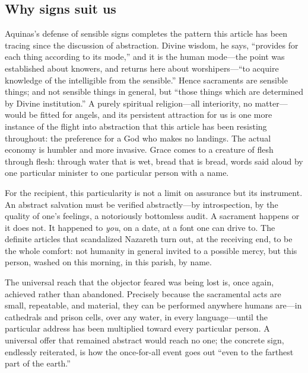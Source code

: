\subsection{Why signs suit us}

Aquinas's defense of sensible signs completes the pattern this article has been tracing since the discussion of abstraction. Divine wisdom, he says, ``provides for each thing according to its mode,'' and it is the human mode---the point was established about knowers, and returns here about worshipers---``to acquire knowledge of the intelligible from the sensible.'' Hence sacraments are sensible things; and not sensible things in general, but ``those things which are determined by Divine institution.'' A purely spiritual religion---all interiority, no matter---would be fitted for angels, and its persistent attraction for us is one more instance of the flight into abstraction that this article has been resisting throughout: the preference for a God who makes no landings. The actual economy is humbler and more invasive. Grace comes to a creature of flesh through flesh: through water that is wet, bread that is bread, words said aloud by one particular minister to one particular person with a name.

For the recipient, this particularity is not a limit on assurance but its instrument. An abstract salvation must be verified abstractly---by introspection, by the quality of one's feelings, a notoriously bottomless audit. A sacrament happens or it does not. It happened to \emph{you}, on a date, at a font one can drive to. The definite articles that scandalized Nazareth turn out, at the receiving end, to be the whole comfort: not humanity in general invited to a possible mercy, but this person, washed on this morning, in this parish, by name.

The universal reach that the objector feared was being lost is, once again, achieved rather than abandoned. Precisely because the sacramental acts are small, repeatable, and material, they can be performed anywhere humans are---in cathedrals and prison cells, over any water, in every language---until the particular address has been multiplied toward every particular person. A universal offer that remained abstract would reach no one; the concrete sign, endlessly reiterated, is how the once-for-all event goes out ``even to the farthest part of the earth.''
